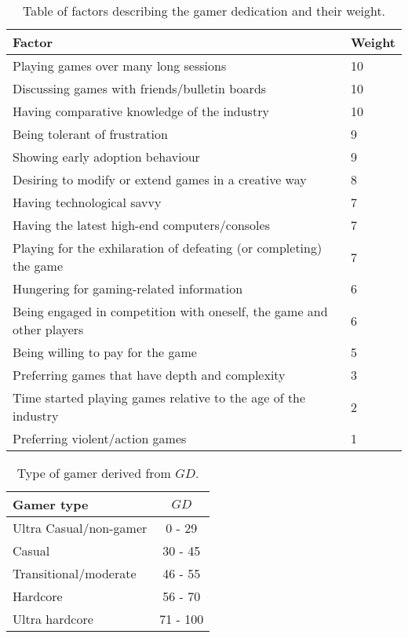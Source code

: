 \begin{table}[h]
\begin{tabular}{|l|l|}
\hline
\rowcolor[HTML]{C0C0C0} 
Factor                                                                & Weight \\ \hline
Playing games over many long sessions                                 & 10     \\ \hline
Discussing games with friends/bulletin boards                         & 10     \\ \hline
Having comparative knowledge of the industry                          & 10     \\ \hline
Being tolerant of frustration                                         & 9      \\ \hline
Showing early adoption behaviour                                      & 9      \\ \hline
Desiring to modify or extend games in a creative way                  & 8      \\ \hline
Having technological savvy                                            & 7      \\ \hline
Having the latest high-end computers/consoles                         & 7      \\ \hline
Playing for the exhilaration of defeating (or completing) the game    & 7      \\ \hline
Hungering for gaming-related information                              & 6      \\ \hline
Being engaged in competition with oneself, the game and other players & 6      \\ \hline
Being willing to pay for the game                                     & 5      \\ \hline
Preferring games that have depth and complexity                       & 3      \\ \hline
Time started playing games relative to the age of the industry        & 2      \\ \hline
Preferring violent/action games                                       & 1      \\ \hline
\end{tabular}
\label{tab:gamerdedication}
\caption{Table of factors describing the gamer dedication and their weight.}
\end{table}

\begin{table}[h]
\begin{tabular}{|l|c|}
\hline
\rowcolor[HTML]{C0C0C0} 
Gamer type             & $GD$     \\ \hline
Ultra Casual/non-gamer & 0 - 29   \\ \hline
Casual                 & 30 - 45  \\ \hline
Transitional/moderate  & 46 - 55  \\ \hline
Hardcore               & 56 - 70  \\ \hline
Ultra hardcore         & 71 - 100 \\ \hline
\end{tabular}
\label{tab:gamertype}
\caption{Type of gamer derived from $GD$.}
\end{table}

